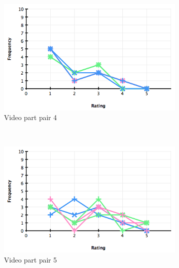 \begin{figure}
  \centering
  \begin{subfigure}[b]{.32\textwidth}
    \centering
      \includegraphics[width=\textwidth]{img/evaluation/hist_video4}
    \caption{Video part pair 4}
    \label{fig:evalVideo4}
  \end{subfigure}%
  ~
  \begin{subfigure}[b]{.32\textwidth}
    \centering
      \includegraphics[width=\textwidth]{img/evaluation/hist_video5}
    \caption{Video part pair 5}
    \label{fig:evalVideo5}
  \end{subfigure}
  ~
  \begin{subfigure}[b]{.32\textwidth}
    \centering

\end{subfigure}
\end{figure}
